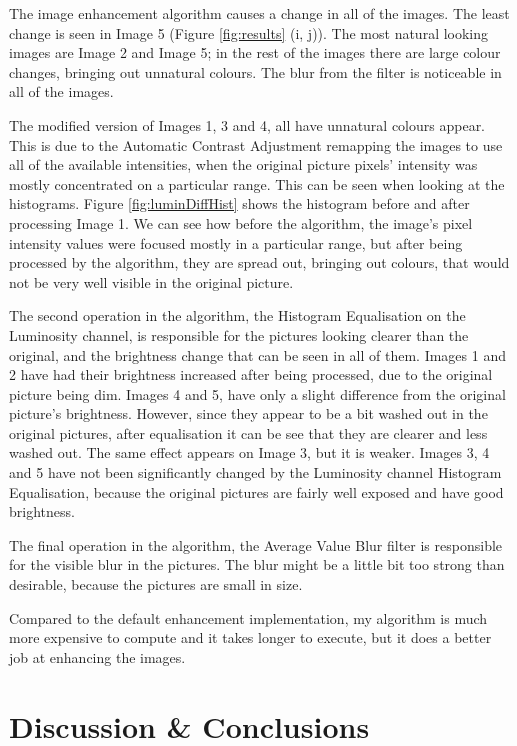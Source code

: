 \documentclass[journal,transmag]{IEEEtran}
\begin{document}
The image enhancement algorithm causes a change in all of the images. 
The least change is seen in Image 5 (Figure \ref{fig:results} (i, j)). The most natural looking images are Image 2 and Image 5; in the rest of the images there are large colour changes, bringing out unnatural colours. The blur from the filter is noticeable in all of the images.

The modified version of Images 1, 3 and 4, all have unnatural colours appear. This is due to the Automatic Contrast Adjustment remapping the images to use all of the available intensities, when the original picture pixels' intensity was mostly concentrated on a particular range. This can be seen when looking at the histograms. Figure \ref{fig:luminDiffHist} shows the histogram before and after processing Image 1. We can see how before the algorithm, the image's pixel intensity values were focused mostly in a particular range, but after being processed by the algorithm, they are spread out, bringing out colours, that would not be very well visible in the original picture.

The second operation in the algorithm, the Histogram Equalisation on the Luminosity channel, is responsible for the pictures looking clearer than the original, and the brightness change that can be seen in all of them. Images 1 and 2 have had their brightness increased after being processed, due to the original picture being dim. Images 4 and 5, have only a slight difference from the original picture's brightness. However, since they appear to be a bit washed out in the original pictures, after equalisation it can be see that they are clearer and less washed out. The same effect appears on Image 3, but it is weaker. Images 3, 4 and 5 have not been significantly changed by the Luminosity channel Histogram Equalisation, because the original pictures are fairly well exposed and have good brightness.

The final operation in the algorithm, the Average Value Blur filter is responsible for the visible blur in the pictures. The blur might be a little bit too strong than desirable, because the pictures are small in size.

Compared to the default enhancement implementation, my algorithm is much more expensive to compute and it takes longer to execute, but it does a better job at enhancing the images.

\section{Discussion \& Conclusions}
\label{sec:discussion}
\end{document}
